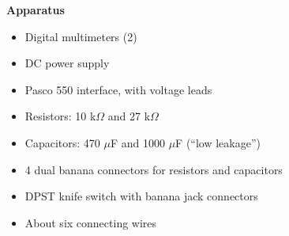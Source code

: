 \makelabheader %

\vspace{0.1in}
\textbf{Apparatus}
\vspace{-\parskip} 
\begin{itemize}[nosep]%
\item Digital multimeters (2) 
\item DC power supply 
\item Pasco 550 interface, with voltage leads
\item Resistors: 10 k$\Omega$ and 27 k$\Omega$
\item Capacitors: 470 $\mu$F and 1000 $\mu$F (``low leakage'')
\item 4 dual banana connectors for resistors and capacitors
\item DPST knife switch with banana jack connectors
\item About six connecting wires
\end{itemize}

